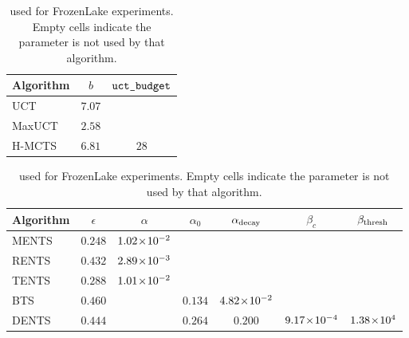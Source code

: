    \begin{table}[tbp]
        \centering
        \begin{subtable}{\textwidth}
            \centering
            \begin{tabular}{l|c|c}
                Algorithm & $b$ & ${\texttt{uct\_budget}}$ \\
                \hline
                UCT     & $7.07$ & \\
                MaxUCT  & $2.58$ & \\
                H-MCTS  & $6.81$ & $28$ \\
            \end{tabular}
            \caption{UCT-based search algorithms.}
        \end{subtable}
    
        \vspace{1em}
    
        \begin{subtable}{\textwidth}
            \centering
            \begin{tabular}{l|c|c|c|c|c|c}
                Algorithm
                    & $\epsilon$
                    & $\alpha$
                    & $\alpha_0$
                    & ${\alpha_{\text{decay}}}$
                    & $\beta_c$
                    & ${\beta_{\text{thresh}}}$ \\
                \hline
                MENTS & $0.248$ & $1.02\!\times\!10^{-2}$ & & & & \\
                RENTS & $0.432$ & $2.89\!\times\!10^{-3}$ & & & & \\
                TENTS & $0.288$ & $1.01\!\times\!10^{-2}$ & & & & \\
                BTS   & $0.460$ & & $0.134$ & $4.82\!\times\!10^{-2}$ & & \\
                DENTS & $0.444$ & & $0.264$ & $0.200$ & $9.17\!\times\!10^{-4}$ & $1.38\!\times\!10^{4}$ \\
            \end{tabular}
            \caption{Boltzmann-based search algorithms.}
        \end{subtable}
    
        \caption[ for FrozenLake experiments.]{ used for  FrozenLake experiments. Empty cells indicate the parameter is not used by that algorithm.}
        \label{table:frozenlake_params}
    \end{table}



